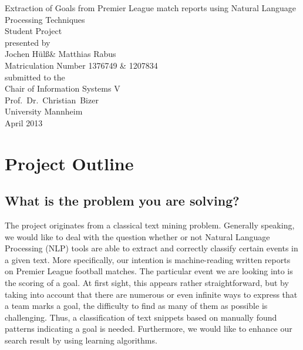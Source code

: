 \documentclass[11pt,titlepage,oneside,openany]{book}
\newcommand{\sss}{\ss\xspace}
\begin{document}
\begin{titlepage}
	\vspace*{2cm}
  \begin{center}
   {\Large Extraction of Goals from Premier League match reports using Natural Language Processing Techniques\\}
   \vspace{2cm} 
   {Student  Project\\}
   \vspace{2cm}
   {presented by\\
    Jochen H\"{u}l\sss  \&  Matthias Rabus \\
    Matriculation Number 1376749 \& 1207834 \\
   }
   \vspace{1cm} 
   {submitted to the\\
    Chair of Information Systems V\\
    Prof.\ Dr.\ Christian\ Bizer\\
    University Mannheim\\} \vspace{2cm}
   {April 2013}
  \end{center}
\end{titlepage} 

\tableofcontents
\newpage





\newpage



\chapter{Project Outline}
\section{What is the problem you are solving?}

The project originates from a classical text mining problem. Generally speaking, we would like to deal with the question whether or not Natural Language Processing (NLP) tools are able to extract and correctly classify certain events in a given text. More specifically, our intention is machine-reading written reports on Premier League football matches. The particular event we are looking into is the scoring of a goal. At first sight, this appears rather straightforward, but by taking into account that there are numerous or even infinite ways to express that a team marks a goal, the difficulty to find as many of them as possible is challenging. Thus, a classification of text snippets based on manually found patterns indicating a goal is needed. Furthermore, we would like to enhance our search result by using learning algorithms.  
\end{document}
